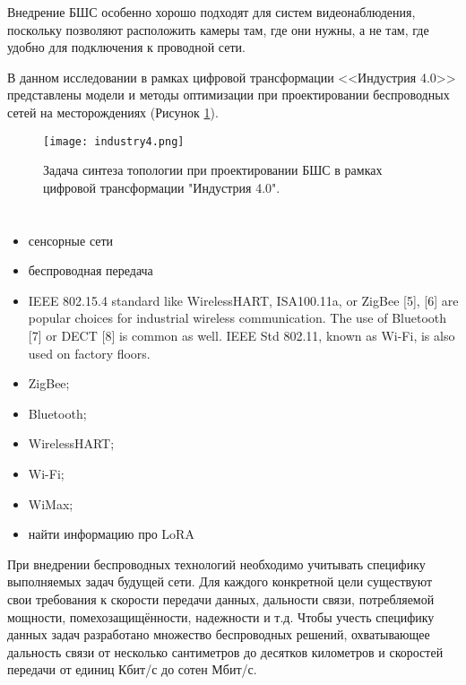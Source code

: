 Внедрение БШС особенно хорошо подходят для систем видеонаблюдения, поскольку позволяют расположить камеры там, где они нужны, а не там, где удобно для подключения к проводной сети.

В данном исследовании в рамках цифровой трансформации <<Индустрия 4.0>> представлены модели и методы оптимизации при проектировании беспроводных сетей на месторождениях  (Рисунок \cref{fig:industry4}).

\begin{figure}[h!]
  \centering
   \texttt{[image: industry4.png]}
\caption{Задача синтеза топологии при проектировании БШС в рамках цифровой трансформации "Индустрия 4.0".}
\label{fig:industry4}
\end{figure}

\section{}

\begin{itemize}
  \item сенсорные сети
  \item беспроводная передача 
\end{itemize}

\begin{itemize}
  \item IEEE 802.15.4 standard like WirelessHART, ISA100.11a,
  or ZigBee [5], [6] are popular choices for industrial wireless
  communication. The use of Bluetooth [7] or DECT [8] is
  common as well. IEEE Std 802.11, known as Wi-Fi, is also
  used on factory floors. 
\end{itemize}

\begin{itemize}
  \item ZigBee;
  \item Bluetooth;
  \item WirelessHART;
  \item Wi-Fi;
  \item WiMax;
  \item найти информацию про LoRA
\end{itemize}



При внедрении беспроводных технологий необходимо учитывать специфику выполняемых задач будущей сети. Для каждого конкретной цели существуют свои требования к скорости передачи данных, дальности связи, потребляемой мощности, помехозащищённости, надежности и т.д. Чтобы учесть специфику данных задач разработано множество беспроводных решений, охватывающее дальность связи от несколько сантиметров до десятков километров и скоростей передачи от единиц Кбит/с до сотен Мбит/с.

